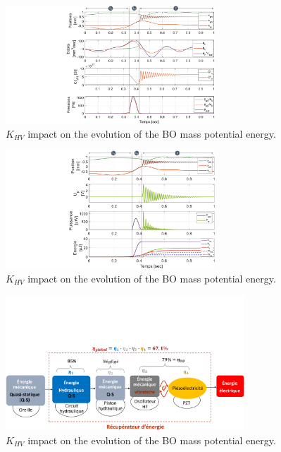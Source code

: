 \documentclass[3p,twocolumn,preprint]{elsarticle}
\begin{document}
\newpage

\label{NUMERICAL MODEL AND SIMULATIONS}
\begin{figure}[!htbp]
	\centering
	\captionsetup{justification=centering}
	\includegraphics[trim={9.5cm 0cm 0cm 0cm},clip, width=0.7\textwidth]{figures/simu_pos_debit_Cf_pression_1CYCLE.pdf}
	\caption{$K_{HV}$ impact on the evolution of the BO mass potential energy.}
	\label{fig:simu_pos_debit_Cf_pression_1CYCLE}
\end{figure}
\begin{figure}[!htbp]
	\centering
	\captionsetup{justification=centering}
	\includegraphics[trim={10cm 0cm 0cm 0cm},clip, width=0.7\textwidth]{figures/simu_pos_Up_puissances_energie_1CYCLE.pdf}
	\caption{$K_{HV}$ impact on the evolution of the BO mass potential energy.}
	\label{fig:simu_pos_Up_puissances_energie_1CYCLE}
\end{figure}
\begin{figure}[!htbp]
	\centering
	\captionsetup{justification=centering}
	\includegraphics[trim={0cm 0cm 0cm 7cm},clip, width=0.8\textwidth]{figures/conversion_symme_rendements.pdf}
	\caption{$K_{HV}$ impact on the evolution of the BO mass potential energy.}
	\label{fig:conversion_symme_rendements.pdf}
\end{figure}
\end{document}
